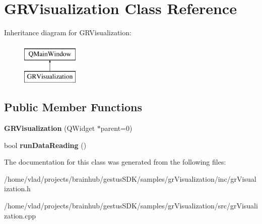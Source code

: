 \hypertarget{classGRVisualization}{}\section{G\+R\+Visualization Class Reference}
\label{classGRVisualization}
Inheritance diagram for G\+R\+Visualization\+:\begin{figure}[H]
\begin{center}
\leavevmode
\includegraphics[height=2.000000cm]{classGRVisualization}
\end{center}
\end{figure}
\subsection*{Public Member Functions}
\begin{DoxyCompactItemize}
\item 
\mbox{\label{classGRVisualization_a55b06fdd92c14a4ec28ef9e23a60a863}} 
{\bfseries G\+R\+Visualization} (Q\+Widget $\ast$parent=0)
\item 
\mbox{\label{classGRVisualization_a0fef01e695378acce52adf9182ffba22}} 
bool {\bfseries run\+Data\+Reading} ()
\end{DoxyCompactItemize}


The documentation for this class was generated from the following files\+:\begin{DoxyCompactItemize}
\item 
/home/vlad/projects/brainhub/gestus\+S\+D\+K/samples/gr\+Visualization/inc/gr\+Visualization.\+h\item 
/home/vlad/projects/brainhub/gestus\+S\+D\+K/samples/gr\+Visualization/src/gr\+Visualization.\+cpp\end{DoxyCompactItemize}
